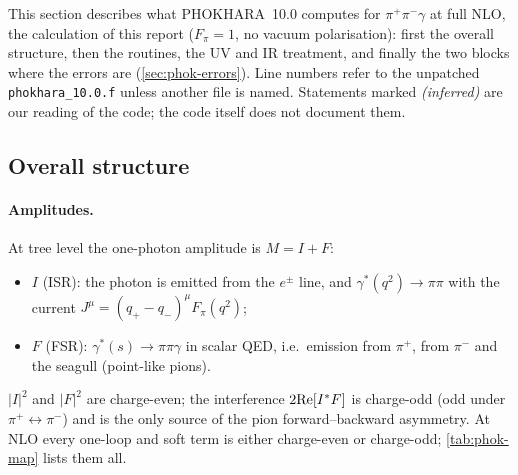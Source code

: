 \documentclass[11pt,a4paper]{article}
\newcommand{\code}[1]{\texttt{#1}}
\newcommand{\phok}{PHOKHARA}
\begin{document}
This section describes what \phok~10.0 computes for $\pi^+\pi^-\gamma$ at full NLO, the
calculation of this report ($F_\pi=1$, no vacuum polarisation): first the overall structure, then the routines, the UV and IR treatment, and
finally the two blocks where the errors are (\cref{sec:phok-errors}). Line numbers refer to the
unpatched \code{phokhara\_10.0.f} unless another file is named. Statements marked
\emph{(inferred)} are our reading of the code; the code itself does not document them.

\subsection{Overall structure}
\label{sec:phok-overview}

\paragraph{Amplitudes.} At tree level the one-photon amplitude is $M=I+F$:
\begin{itemize}
\item $I$ (ISR): the photon is emitted from the $e^\pm$ line, and $\gamma^*(q^2)\to\pi\pi$ with
  the current $J^\mu=(q_+-q_-)^\mu F_\pi(q^2)$;
\item $F$ (FSR): $\gamma^*(s)\to\pi\pi\gamma$ in scalar QED, i.e.\ emission from $\pi^+$, from
  $\pi^-$ and the seagull (point-like pions).
\end{itemize}
$|I|^2$ and $|F|^2$ are charge-even; the interference $2{\rm Re}[I^*F]$ is charge-odd (odd under
$\pi^+\leftrightarrow\pi^-$) and is the only source of the pion forward--backward asymmetry. At
NLO every one-loop and soft term is either charge-even or charge-odd; \cref{tab:phok-map} lists
them all.
\end{document}
